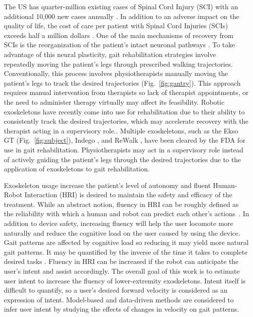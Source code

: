 The US has quarter-million existing cases of Spinal Cord Injury (SCI) with an additional 10,000 new cases annually \cite{nih}. In addition to an adverse impact on the quality of life, the cost of care per patient with Spinal Cord Injuries (SCIs) exceeds half a million dollars \cite{devivo2011costs}. One of the main mechanisms of recovery from SCIs is the reorganization of the patient's intact neuronal pathways \cite{curt2008recovery}. To take advantage of this neural plasticity, gait rehabilitation strategies involve repeatedly moving the patient's legs through prescribed walking trajectories. Conventionally, this process involves physiotherapists manually moving the patient's legs to track the desired trajectories (Fig.~\ref{fig:gantry}). %
This approach requires manual intervention from therapists so lack of therapist appointments, or the need to administer therapy virtually may affect its feasibility. Robotic exoskeletons have recently come into use for rehabilitation due to their ability to consistently track the desired trajectories, which may accelerate recovery \cite{hidler2011role} with the therapist acting in a supervisory role.. Multiple exoskeletons, such as the Ekso GT \cite{brenner2016exploring} (Fig.~\ref{fig:subject}), Indego \cite{sup2008design}, and ReWalk \cite{rewalk}, have been cleared by the FDA for use in gait rehabilitation. Physiotherapists may act in a supervisory role instead of actively guiding the patient's legs through the desired trajectories due to the application of exoskeletons to gait rehabilitation. 

Exoskeleton usage increase the patient's level of autonomy and fluent Human-Robot Interaction (HRI) is desired to maintain the safety and efficacy of the treatment. While an abstract notion, fluency in HRI can be roughly defined as the reliability with which a human and robot can predict each other's actions~\cite{hoffman2007cost}. In addition to device safety, increasing fluency will help the user locomote more naturally and reduce the cognitive load on the user caused by using the device. Gait patterns are affected by cognitive load \cite{bogen2018walk} so reducing it may yield more natural gait patterns. It may be quantified by the inverse of the time it takes to complete desired tasks \cite{hoffman2019evaluating}. Fluency in HRI can be increased if the robot can anticipate the user's intent and assist accordingly. The overall goal of this work is to estimate user intent to increase the fluency of lower-extremity exoskeletons. Intent itself is difficult to quantify, so a user's desired forward velocity is considered as an expression of intent. Model-based and data-driven methods are considered to infer user intent by studying the effects of changes in velocity on gait patterns.

